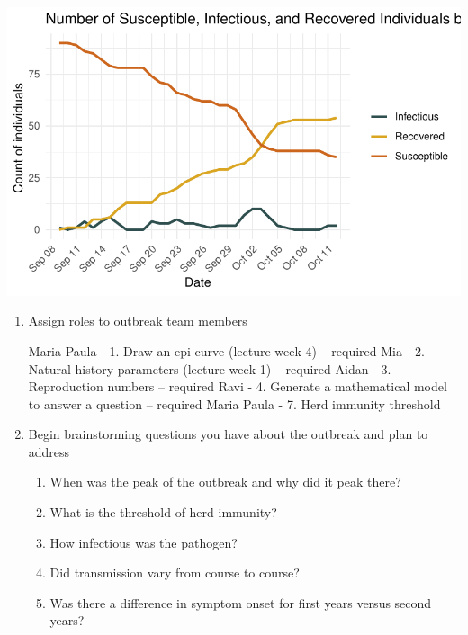 \documentclass[
  letterpaper,
  DIV=11,
  numbers=noendperiod]{scrartcl}
\begin{document}
\includegraphics{Clean-Data-Work-in-Progress_files/figure-pdf/unnamed-chunk-8-1.pdf}

\begin{enumerate}
\def\labelenumi{\arabic{enumi}.}
\setcounter{enumi}{2}
\item
  Assign roles to outbreak team members

  Maria Paula - 1. Draw an epi curve (lecture week 4) -- required Mia -
  2. Natural history parameters (lecture week 1) -- required Aidan - 3.
  Reproduction numbers -- required Ravi - 4. Generate a mathematical
  model to answer a question -- required Maria Paula - 7. Herd immunity
  threshold
\item
  Begin brainstorming questions you have about the outbreak and plan to
  address

  \begin{enumerate}
  \def\labelenumii{\arabic{enumii}.}
  \item
    When was the peak of the outbreak and why did it peak there?
  \item
    What is the threshold of herd immunity?
  \item
    How infectious was the pathogen?
  \item
    Did transmission vary from course to course?
  \item
    Was there a difference in symptom onset for first years versus
    second years?
  \end{enumerate}
\end{enumerate}
\end{document}
